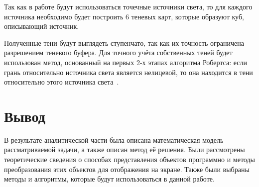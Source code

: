 Так как в работе будут использоваться точечные источники света, то для каждого источника необходимо будет построить 6 теневых карт, которые образуют куб, описывающий источник.

Полученные тени будут выглядеть ступенчато, так как их точность ограничена разрешением теневого буфера. Для точного учёта собственных теней будет использован метод, основанный на первых 2-х этапах алгоритма Робертса: если грань относительно источника света является нелицевой, то она находится в тени относительно этого источника света~\cite{rodgers}.

\section*{Вывод}

В результате аналитической части была описана математическая модель рассматриваемой задачи, а также описан метод её решения. Были рассмотрены теоретические сведения о способах представления объектов программно и методы преобразования этих объектов для отображения на экране. Также были выбраны методы и алгоритмы, которые будут использоваться в данной работе.

\clearpage

